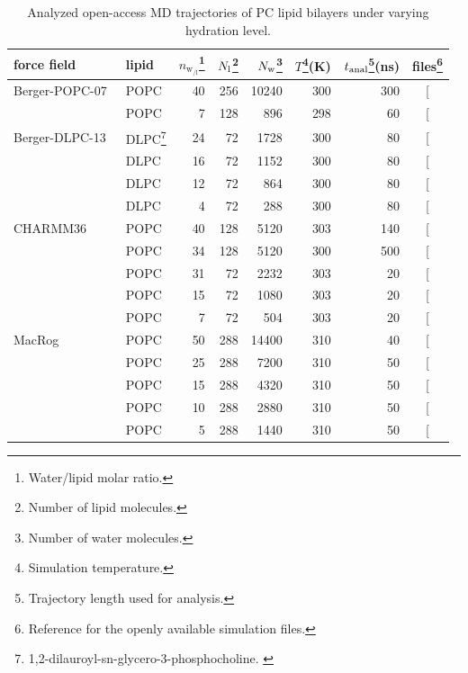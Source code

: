 \documentclass[journal=jcisd8,manuscript=article,layout=twocolumn]{achemso}
\begin{document}
\begin{table}[]
\caption{Analyzed open-access MD trajectories of PC lipid bilayers under varying hydration level.}
\begin{minipage}[t]{\columnwidth}
\resizebox{\columnwidth}{!} {
\begin{tabular}{llrrrrrc}
force field  &
lipid  &
$n_{{\mathrm w\!}_{/\mathrm l}}$\footnote{Water/lipid molar ratio.}  &
$N_{\rm l}$\footnote{Number of lipid molecules.}  &
$N_{\rm w}$\footnote{Number of water molecules.} &
$T$\footnote{Simulation temperature.}(K)  &
$t_{{\rm anal}}$\footnote{Trajectory length used for analysis.}(ns) &
files\footnote{Reference for the openly available simulation files.} \tabularnewline
\hline 
Berger-POPC-07~\cite{ollila07a} 
	& POPC & 40 & 256 & 10240 & 300 & 300  & {[}\!\!\citenum{bergerFILESpopcT300}{]} \tabularnewline		
	& POPC  & 7  & 128  & 896  & 298  & 60  & {[}\!\!\citenum{bergerDEHYDfiles}{]} \tabularnewline

Berger-DLPC-13~\cite{kanduc13}
	& DLPC\footnote{1,2-dilauroyl-sn-glycero-3-phosphocholine. \label{fn:DLPC}}  & 24  & 72  & 1728  & 300  & 80  & {[}\!\!\citenum{bergerFILESdlpc24}{]} \tabularnewline
	& DLPC\footref{fn:DLPC}  & 16  & 72  & 1152  & 300  & 80  & {[}\!\!\citenum{bergerFILESdlpc16}{]} \tabularnewline
	& DLPC\footref{fn:DLPC}  & 12  & 72  & 864  & 300  & 80  & {[}\!\!\citenum{bergerFILESdlpc12}{]} \tabularnewline
	& DLPC\footref{fn:DLPC}  & 4  & 72  & 288  & 300  & 80  & {[}\!\!\citenum{bergerFILESdlpc4}{]} \tabularnewline[1.0ex]
	
CHARMM36\cite{klauda10} 
	& POPC  & 40  & 128  & 5120  & 303  & 140 & {[}\!\!\citenum{charmm36files}{]} \tabularnewline
	& POPC  & 34	&  128  & 5120 & 300 & 500  & {[}\!\!\citenum{macrogfilesT300}{]}\tabularnewline
	& POPC  & 31 & 72 & 2232 & 303 & 20 & {[}\!\!\citenum{charmm36files31wPERl}{]}\tabularnewline
	& POPC  & 15  & 72  & 1080  & 303  & 20  & {[}\!\!\citenum{charmm36files15wPERl}{]} \tabularnewline
	& POPC  & 7  & 72  & 504  & 303  & 20  & {[}\!\!\citenum{charmm36files7wPERl}{]} \tabularnewline[1.0ex]
MacRog\cite{kulig15} 
	& POPC  & 50  & 288  & 14400  & 310  & 40  & {[}\!\!\citenum{macrogdehydFILES}{]} \tabularnewline
	& POPC  & 25  & 288  & 7200  & 310  & 50  & {[}\!\!\citenum{macrogdehydFILES}{]} \tabularnewline	
	& POPC  & 15  & 288  & 4320  & 310  & 50 & {[}\!\!\citenum{macrogdehydFILES}{]} \tabularnewline
	& POPC  & 10  & 288  & 2880  & 310  & 50  & {[}\!\!\citenum{macrogdehydFILES}{]} \tabularnewline
	& POPC  & 5  & 288  & 1440  & 310  & 50  & {[}\!\!\citenum{macrogdehydFILES}{]} \tabularnewline
\end{tabular}
}
\label{tab:hydr}
\end{minipage}

\end{table}
\end{document}
